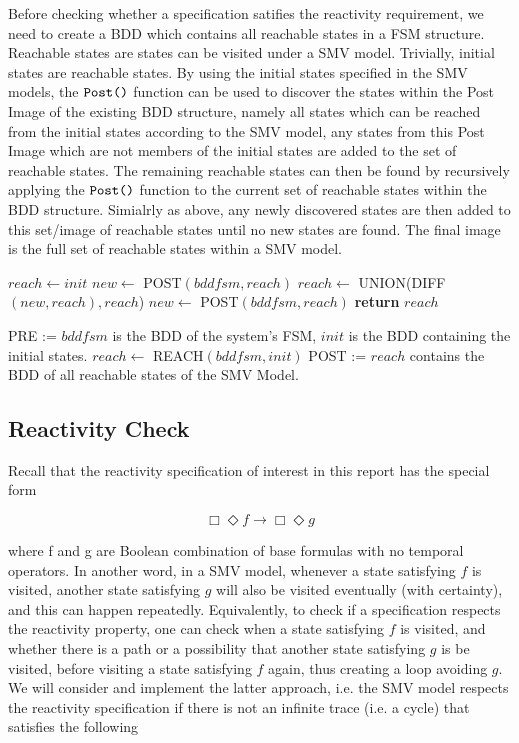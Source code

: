 \documentclass{article}
\begin{document}
Before checking whether a specification satifies the reactivity requirement, we need to create a BDD which contains all reachable states in a FSM structure. Reachable states are states can be visited under a SMV model. Trivially, initial states are reachable states. By using the initial states specified in the SMV models, the $\verb|Post()|$ function can be used to discover the states within the Post Image of the existing BDD structure, namely all states which can be reached from the initial states according to the SMV model, any states from this Post Image which are not members of the initial states are added to the set of reachable states. The remaining reachable states can then be found by recursively applying the $\verb|Post()|$ function to the current set of reachable states within the BDD structure. Simialrly as above, any newly discovered states are then added to this set/image of reachable states until no new states are found. The final image is the full set of reachable states within a SMV model.

\begin{algorithmic}[1]
    \State $reach\leftarrow init$
    \State $new\leftarrow$ POST$(bddfsm, reach)$
        \State $reach\leftarrow$ UNION(DIFF$(new, reach),reach$)
        \State $new\leftarrow$ POST$(bddfsm, reach)$
    \EndWhile
    \State \textbf{return }$reach$
\EndFunction
\item[]
\State PRE := $bddfsm$ is the BDD of the system's FSM, $init$ is the BDD containing the initial states.
\State $reach\leftarrow$ REACH$(bddfsm, init)$
\State POST := $reach$ contains the BDD of all reachable states of the SMV Model.
\end{algorithmic}

\subsection{Reactivity Check}

Recall that the reactivity specification of interest in this report has the special form

\[ \Box\Diamond f \rightarrow \Box\Diamond g\]

where f and g are Boolean combination of base formulas with no temporal operators. In another word, in a SMV model, whenever a state satisfying $f$ is visited, another state satisfying $g$ will also be visited eventually (with certainty), and this can happen repeatedly. Equivalently, to check if a specification respects the reactivity property, one can check when a state satisfying $f$ is visited, and whether there is a path or a possibility that another state satisfying $g$ is be visited, before visiting a state satisfying $f$ again, thus creating a loop avoiding $g$. We will consider and implement the latter approach, i.e. the SMV model respects the reactivity specification if there is not an infinite trace (i.e. a cycle) that satisfies the following
\end{document}
